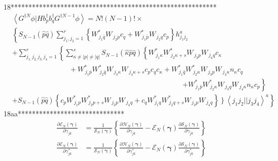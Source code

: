 \documentclass[aps,preprint]{revtex4}%
\begin{document}
18**********************************************************%
\begin{align*}
&  \left\langle G^{\dagger N}\phi|Hb_{p}^{\dagger}b_{q}^{\dagger}G^{\dagger
N-1}\phi\right\rangle =N!\left(  N-1\right)  !\times\\
&  \left\{  S_{N-1}\left(  \hat{p}\hat{q}\right)  \sum_{j_{1},j_{2}=1}%
^{r}\left\{  W_{\,j_{1}\bar{q}}^{\ast}W_{\,j_{2}p}c_{q}+W_{\,j_{1}\bar{p}%
}^{\ast}W_{\,j_{2}q}c_{p}\right\}  h_{j_{1}j_{2}}^{a}\right. \\
&  +\sum_{j_{1,}j_{2,}j_{3,}j_{4}=1}^{r}\left\{  \sum_{\kappa\neq\left\vert
p\right\vert \neq\left\vert q\right\vert }^{s}S_{N-1}\left(  \hat{\kappa}%
\hat{p}\hat{q}\right)  \left\{  W_{\,j_{1}\kappa}^{\ast}W_{\,j_{2}\kappa
+s}^{\ast}W_{\,j_{3}p}W_{\,j_{4}q}c_{\kappa}\right.  \right. \\
&  \qquad\qquad\qquad\qquad+W_{\,j_{1}\bar{p}}^{\ast}W_{\,j_{2}\bar{q}}^{\ast
}W_{\,j_{3}\kappa}W_{\,j_{4}\kappa+s}c_{p}c_{q}c_{\kappa}+W_{\,j_{1}\bar{q}%
}^{\ast}W_{\,j_{2}\kappa}^{\ast}W_{\,j_{3}p}W_{\,j_{4}\kappa}n_{\kappa}c_{q}\\
&  \qquad\qquad\qquad\qquad\qquad\qquad\qquad\qquad\qquad\qquad\qquad
\qquad\left.  +W_{\,j_{1}\bar{p}}^{\ast}W_{\,j_{2}\kappa}^{\ast}W_{\,j_{3}%
q}W_{\,j_{4}\kappa}n_{\kappa}c_{p}\right\} \\
&  +S_{N-1}\left(  \hat{p}\hat{q}\right)  \left\{  c_{p}W_{\,j_{1}p}^{\ast
}W_{\,j_{2}p+s}^{\ast}W_{\,j_{3}p}W_{\,j_{4}q}+c_{q}W_{\,j_{1}q}^{\ast
}W_{\,j_{2}q+s}^{\ast}W_{\,j_{3}p}W_{\,j_{4}q}\right\}  \left.  \left.
\underset{}{\overset{}{}}\right\}  \left\langle j_{1}j_{2}||j_{3}%
j_{4}\right\rangle ^{a}\underset{}{\overset{\underset{}{\overset{}{}}}{}%
}\right\}
\end{align*}
18aa******************************%
\begin{align*}
\frac{\partial\mathcal{E}_{N}\left(  \mathbf{\gamma}\right)  }{\partial
\gamma_{jk}}  &  =\frac{1}{\mathcal{S}_{N}\left(  \mathbf{\gamma}\right)
}\left\{  \frac{\partial\mathcal{H}_{N}\left(  \mathbf{\gamma}\right)
}{\partial\gamma_{jk}}-\mathcal{E}_{N}\left(  \mathbf{\gamma}\right)
\frac{\partial\mathcal{S}_{N}\left(  \mathbf{\gamma}\right)  }{\partial
\gamma_{jk}}\right\} \\
\frac{\partial\mathcal{E}_{N}\left(  \mathbf{\gamma}\right)  }{\partial
\gamma_{jk}^{\ast}}  &  =\frac{1}{\mathcal{S}_{N}\left(  \mathbf{\gamma
}\right)  }\left\{  \frac{\partial\mathcal{H}_{N}\left(  \mathbf{\gamma
}\right)  }{\partial\gamma_{jk}^{\ast}}-\mathcal{E}_{N}\left(  \mathbf{\gamma
}\right)  \frac{\partial\mathcal{S}_{N}\left(  \mathbf{\gamma}\right)
}{\partial\gamma_{jk}^{\ast}}\right\}
\end{align*}
\end{document}
